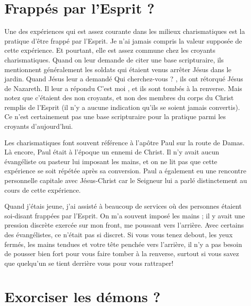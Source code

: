 \section{Frapp\'es par l'Esprit ?}

Une des expériences qui est assez courante dans les milieux charismatiques
 est la pratique d'être \Og frappé par l'Esprit. \Fg{}
 Je n'ai jamais compris la valeur supposée de cette expérience.
 Et pourtant, elle est assez commune chez les croyants charismatiques.
 Quand on leur demande de citer une base scripturaire,
 ils mentionnent généralement les soldats qui étaient venus arrêter
 Jésus dans le jardin. Quand Jésus leur a demandé\frcolon{}
 \Og Qui cherchez-vous ? \Fg{}, ils ont rétorqué\frcolon{}
 \Og Jésus de Nazareth. \Fg{} Il leur a répondu\frcolon{}
 \Og C'est moi \Fg{}, et ils sont tombés à la renverse.
 Mais notez que c'étaient des non croyants, et non des membres
 du corps du Christ remplis de l'Esprit (il n'y a aucune indication
 qu'ils se soient jamais convertis). Ce n'est certainement pas une base
 scripturaire pour la pratique parmi les croyants d'aujourd'hui.

Les charismatiques font souvent référence à l'apôtre Paul sur la route
 de Damas. Là encore, Paul était à l'époque un ennemi de Christ.
 Il n'y avait aucun évangéliste ou pasteur lui imposant les mains,
 et on ne lit pas que cette expérience se soit répétée après sa conversion.
 Paul a également eu une rencontre personnelle capitale avec Jésus-Christ
 car le Seigneur lui a parlé distinctement au cours de cette expérience.

Quand j'étais jeune, j'ai assisté à beaucoup de services où des personnes
 étaient soi-disant frappées par l'Esprit.
 On m'a souvent imposé les mains ;
 il y avait une pression discrète exercée sur mon front,
 me poussant vers l'arrière. Avec certains des évangélistes,
 ce n'était pas si discret. Si vous vous tenez debout, les yeux fermés,
 les mains tendues et votre tête penchée vers l'arrière,
 il n'y a pas besoin de pousser bien fort pour vous faire tomber
 à la renverse, surtout si vous savez que quelqu'un se tient derrière
 vous pour vous rattraper!
 \nowidow[5]


\section{Exorciser les d\'emons ?}

